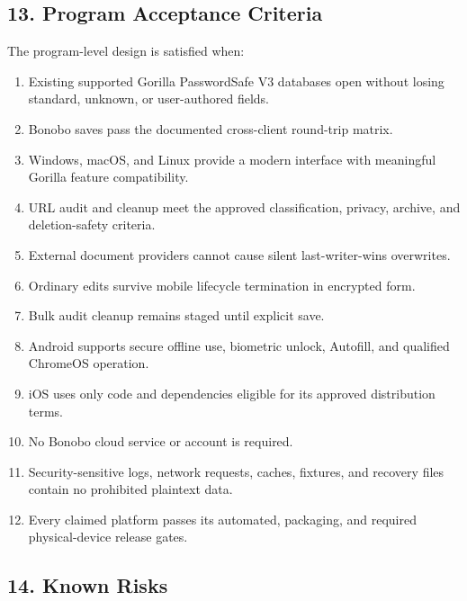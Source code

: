 \documentclass[
  letterpaper,
]{article}
\providecommand{\tightlist}{%
  \setlength{\itemsep}{0pt}\setlength{\parskip}{0pt}}
\begin{document}
\subsection{13. Program Acceptance Criteria}\label{13-program-acceptance-criteria}

The program-level design is satisfied when:

\begin{enumerate}
\def\labelenumi{\arabic{enumi}.}
\tightlist
\item
  Existing supported Gorilla PasswordSafe V3 databases open without losing standard, unknown, or user-authored fields.
\item
  Bonobo saves pass the documented cross-client round-trip matrix.
\item
  Windows, macOS, and Linux provide a modern interface with meaningful Gorilla feature compatibility.
\item
  URL audit and cleanup meet the approved classification, privacy, archive, and deletion-safety criteria.
\item
  External document providers cannot cause silent last-writer-wins overwrites.
\item
  Ordinary edits survive mobile lifecycle termination in encrypted form.
\item
  Bulk audit cleanup remains staged until explicit save.
\item
  Android supports secure offline use, biometric unlock, Autofill, and qualified ChromeOS operation.
\item
  iOS uses only code and dependencies eligible for its approved distribution terms.
\item
  No Bonobo cloud service or account is required.
\item
  Security-sensitive logs, network requests, caches, fixtures, and recovery files contain no prohibited plaintext data.
\item
  Every claimed platform passes its automated, packaging, and required physical-device release gates.
\end{enumerate}

\subsection{14. Known Risks}\label{14-known-risks}
\end{document}
